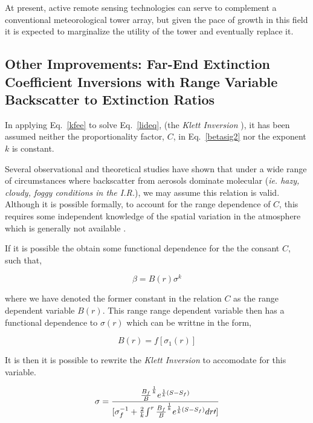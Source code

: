 At present, active remote sensing technologies can serve to 
complement a conventional meteorological tower array, but given the pace of 
growth in this field it is expected to marginalize the utility of 
the tower and eventually replace it.

\subsection{Other Improvements: Far-End Extinction Coefficient 
Inversions with Range Variable
Backscatter to Extinction Ratios}

In applying Eq.~{\ref{kfee}} to solve Eq.~{\ref{lideq}}, 
(the {\em Klett Inversion} \cite{jdk1}), 
it has been assumed neither the proportionality factor, $C$, 
in Eq.~{\ref{betasig2}} nor the exponent $k$ is constant. 

Several observational and theoretical studies have shown that
under a wide range of circumstances where backscatter from
aerosols dominate molecular ({\em ie. hazy, cloudy, foggy conditions
in the I.R.}), we may assume this relation is valid. Although it 
is possible formally, to account for the range dependence of $C$,  
this requires some independent knowledge of the spatial variation
in the atmosphere which is generally not available \cite{jdk2}.

If it is possible the obtain some functional dependence 
for the the consant $C$, such that,

\begin{equation}
\beta= B(r) \sigma^k
\label{BR}
\end{equation}

\noindent
where we have denoted the former constant in the relation 
$C$ as the range dependent variable $B(r)$. This range
range dependent variable then has a functional dependence
to ${\sigma(r)}$ which can be writtne in the form,

\begin{equation}
B(r)=f[{\sigma_{1}}(r)]
\label{brig}
\end{equation}

It is then it is possible to rewrite the {\em Klett Inversion} to
accomodate for this variable.

\begin{equation}
{\sigma} = {{{B_f}\over{B}}^{1\over{k}}e^{{1\over k}(S-S_f)}\over 
{[\sigma_f^{-1}+{2\over k}{\int^r {{B_f}\over{B}}^{1\over{k}}
e^{{1\over k}(S-S_f)}dr\prime ]}}} 
\label{bakvar}
\end{equation}

